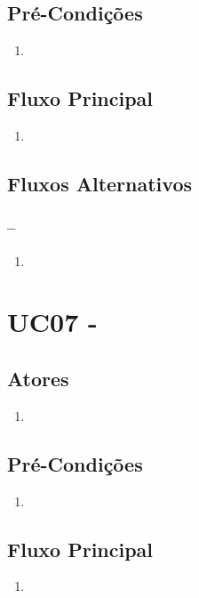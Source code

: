 \subsection{Pré-Condições}
\begin{enumerate}
  \item
\end{enumerate}

\subsection{Fluxo Principal}
\begin{enumerate}
  \item
\end{enumerate}

\subsection{Fluxos Alternativos}

\subsubsection{--}

\begin{enumerate}
  \item
\end{enumerate}

\section{UC07 -}


\subsection{Atores}

\begin{enumerate}
  \item
\end{enumerate}

\subsection{Pré-Condições}
\begin{enumerate}
  \item
\end{enumerate}

\subsection{Fluxo Principal}
\begin{enumerate}
  \item
\end{enumerate}

